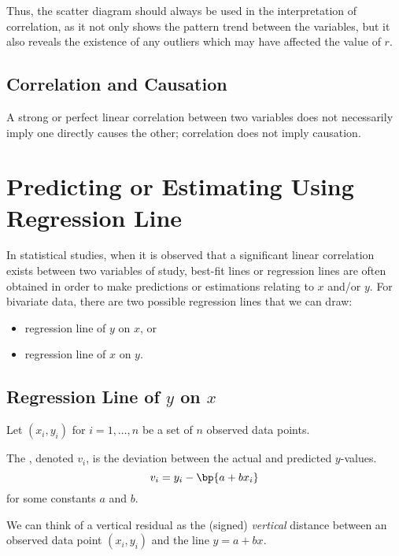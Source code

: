 Thus, the scatter diagram should always be used in the interpretation of correlation, as it not only shows the pattern trend between the variables, but it also reveals the existence of any outliers which may have affected the value of $r$.

\subsection{Correlation and Causation}

A strong or perfect linear correlation between two variables does not necessarily imply one directly causes the other; correlation does not imply causation.

\section{Predicting or Estimating Using Regression Line}

In statistical studies, when it is observed that a significant linear correlation exists between two variables of study, best-fit lines or regression lines are often obtained in order to make predictions or estimations relating to $x$ and/or $y$. For bivariate data, there are two possible regression lines that we can draw:
\begin{itemize}
    \item regression line of $y$ on $x$, or
    \item regression line of $x$ on $y$.
\end{itemize}

\subsection{Regression Line of $y$ on $x$}

Let $(x_i, y_i)$ for $i = 1, \dots, n$ be a set of $n$ observed data points.

\begin{definition}
    The , denoted $v_i$, is the deviation between the actual and predicted $y$-values. \[v_i = y_i - \bp{a + bx_i}\] for some constants $a$ and $b$.
\end{definition}

We can think of a vertical residual as the (signed) \emph{vertical} distance between an observed data point $(x_i, y_i)$ and the line $y = a + bx$.


